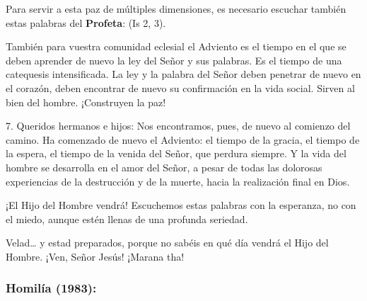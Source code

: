 \begin{body}
	Para servir a esta paz de múltiples dimensiones, es necesario escuchar también estas palabras del \textbf{Profeta}:  (Is 2, 3). 
	
	También para vuestra comunidad eclesial el Adviento es el tiempo en el que se deben aprender de nuevo la ley del Señor y sus palabras. Es el tiempo de una catequesis intensificada. La ley y la palabra del Señor deben penetrar de nuevo en el corazón, deben encontrar de nuevo su confirmación en la vida social. Sirven al bien del hombre. ¡Construyen la paz! 
	
	7. Queridos hermanos e hijos: Nos encontramos, pues, de nuevo al comienzo del camino. Ha comenzado de nuevo el Adviento: el tiempo de la gracia, el tiempo de la espera, el tiempo de la venida del Señor, que perdura siempre. Y la vida del hombre se desarrolla en el amor del Señor, a pesar de todas las dolorosas experiencias de la destrucción y de la muerte, hacia la realización final en Dios. 
	
	¡El Hijo del Hombre vendrá! Escuchemos estas palabras con la esperanza, no con el miedo, aunque estén llenas de una profunda seriedad. 
	
	Velad\ldots{} y estad preparados, porque no sabéis en qué día vendrá el Hijo del Hombre. ¡Ven, Señor Jesús! ¡Marana tha!
\end{body}


\subsubsection{Homilía (1983):}


